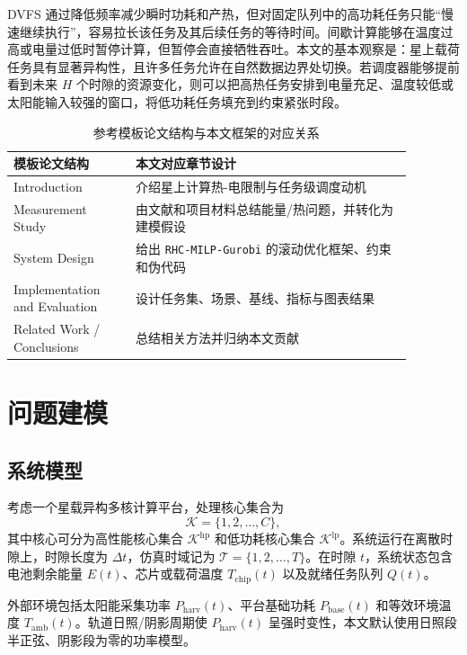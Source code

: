 \documentclass[conference]{IEEEtran}
\newcommand{\rhc}{\texttt{RHC-MILP-Gurobi}}
\begin{document}
DVFS 通过降低频率减少瞬时功耗和产热，但对固定队列中的高功耗任务只能“慢速继续执行”，容易拉长该任务及其后续任务的等待时间。间歇计算能够在温度过高或电量过低时暂停计算，但暂停会直接牺牲吞吐。本文的基本观察是：星上载荷任务具有显著异构性，且许多任务允许在自然数据边界处切换。若调度器能够提前看到未来 $H$ 个时隙的资源变化，则可以把高热任务安排到电量充足、温度较低或太阳能输入较强的窗口，将低功耗任务填充到约束紧张时段。

\begin{table}[t]
\centering
\caption{参考模板论文结构与本文框架的对应关系}
\label{tab:template-map}
\begin{tabular}{p{0.27\linewidth}p{0.61\linewidth}}
\toprule
模板论文结构 & 本文对应章节设计 \\
\midrule
Introduction & 介绍星上计算热-电限制与任务级调度动机 \\
Measurement Study & 由文献和项目材料总结能量/热问题，并转化为建模假设 \\
System Design & 给出 \rhc{} 的滚动优化框架、约束和伪代码 \\
Implementation and Evaluation & 设计任务集、场景、基线、指标与图表结果 \\
Related Work / Conclusions & 总结相关方法并归纳本文贡献 \\
\bottomrule
\end{tabular}
\end{table}

\section{问题建模}

\subsection{系统模型}

考虑一个星载异构多核计算平台，处理核心集合为
\begin{equation}
  \mathcal{K}=\{1,2,\dots,C\},
\end{equation}
其中核心可分为高性能核心集合 $\mathcal{K}^{\mathrm{hp}}$ 和低功耗核心集合 $\mathcal{K}^{\mathrm{lp}}$。系统运行在离散时隙上，时隙长度为 $\Delta t$，仿真时域记为 $\mathcal{T}=\{1,2,\dots,T\}$。在时隙 $t$，系统状态包含电池剩余能量 $E(t)$、芯片或载荷温度 $T_{\mathrm{chip}}(t)$ 以及就绪任务队列 $Q(t)$。

外部环境包括太阳能采集功率 $P_{\mathrm{harv}}(t)$、平台基础功耗 $P_{\mathrm{base}}(t)$ 和等效环境温度 $T_{\mathrm{amb}}(t)$。轨道日照/阴影周期使 $P_{\mathrm{harv}}(t)$ 呈强时变性，本文默认使用日照段半正弦、阴影段为零的功率模型。
\end{document}
